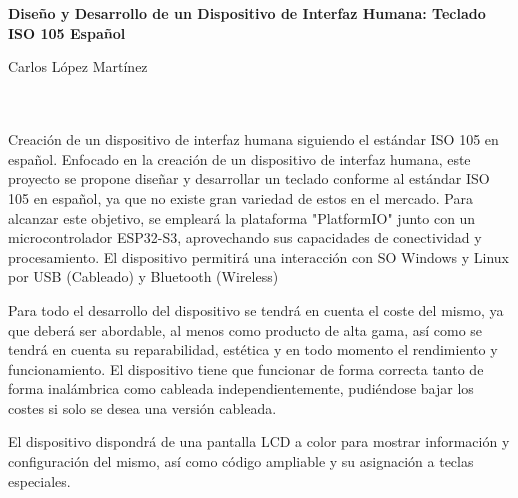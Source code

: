 \chapter*{}






\cleardoublepage
\thispagestyle{empty}

\begin{center}
{\large\bfseries Diseño y Desarrollo de un Dispositivo de Interfaz Humana: Teclado ISO 105 Español}\\
\end{center}
\begin{center}
Carlos López Martínez\\
\end{center}

\\

\vspace{0.7cm}
\\

Creación de un dispositivo de interfaz humana siguiendo el estándar ISO 105 en español. Enfocado en la creación de un dispositivo de interfaz humana, este proyecto se propone diseñar y desarrollar un teclado conforme al estándar ISO 105 en español, ya que no existe gran variedad de estos en el mercado. Para alcanzar este objetivo, se empleará la plataforma "PlatformIO" junto con un microcontrolador ESP32-S3, aprovechando sus capacidades de conectividad y procesamiento. El dispositivo permitirá una interacción con SO Windows y Linux por USB (Cableado) y Bluetooth (Wireless)

Para todo el desarrollo del dispositivo se tendrá en cuenta el coste del mismo, ya que deberá ser abordable, al menos como producto de alta gama, así como se tendrá en cuenta su reparabilidad, estética y en todo momento el rendimiento y funcionamiento.
El dispositivo tiene que funcionar de forma correcta tanto de forma inalámbrica como cableada independientemente, pudiéndose bajar los costes si solo se desea una versión cableada.

El dispositivo dispondrá de una pantalla LCD a color para mostrar información y configuración del mismo, así como código ampliable y su asignación a teclas especiales.
\cleardoublepage


